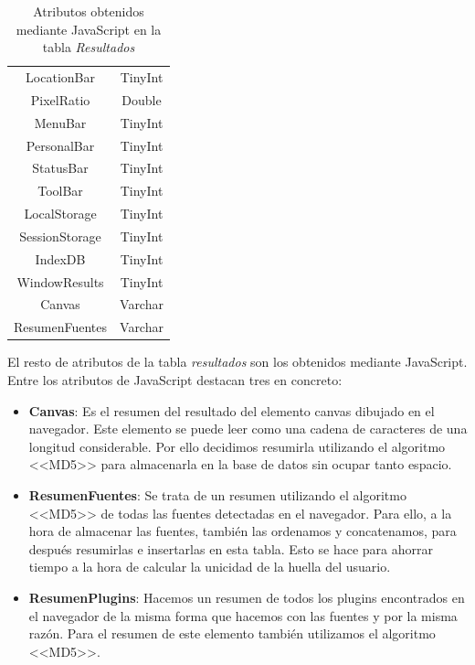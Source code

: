 \begin{itemize}
\begin{table}[tbp]
\begin{minipage}[c]{45mm}
\begin{tabular}{c|c}
                LocationBar & TinyInt\\
                PixelRatio & Double\\
                MenuBar & TinyInt\\
                PersonalBar & TinyInt\\
                StatusBar & TinyInt\\
                ToolBar & TinyInt\\
                LocalStorage & TinyInt\\
                SessionStorage & TinyInt\\
                IndexDB & TinyInt\\
                WindowResults & TinyInt\\
                Canvas & Varchar\\
                ResumenFuentes & Varchar\\
            \end{tabular}
        \end{minipage}
        \caption{Atributos obtenidos mediante JavaScript en la tabla \textit{Resultados}}
        \label{tab:resultadosJavascript}
    \end{table}
    El resto de atributos de la tabla \textit{resultados} son los obtenidos mediante JavaScript. Entre los atributos de JavaScript destacan tres en concreto:
    \begin{itemize}
        \item \textbf{Canvas}: Es el resumen del resultado del elemento canvas dibujado en el navegador. Este elemento se puede leer como una cadena de caracteres de una longitud considerable. Por ello decidimos resumirla utilizando el algoritmo <<MD5>> para almacenarla en la base de datos sin ocupar tanto espacio.
        \item \textbf{ResumenFuentes}: Se trata de un resumen utilizando el algoritmo <<MD5>> de todas las fuentes detectadas en el navegador. Para ello, a la hora de almacenar las fuentes, también las ordenamos y concatenamos, para después resumirlas e insertarlas en esta tabla. Esto se hace para ahorrar tiempo a la hora de calcular la unicidad de la huella del usuario.
        \item \textbf{ResumenPlugins}: Hacemos un resumen de todos los plugins encontrados en el navegador de la misma forma que hacemos con las fuentes y por la misma razón. Para el resumen de este elemento también utilizamos el algoritmo <<MD5>>.
    \end{itemize}

\end{itemize}
